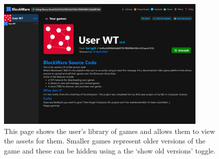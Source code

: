 \begin{figure}[H]
  \centering
  \includegraphics[width=0.9\textwidth]{assets/images/screenshots/library.png}
  \caption{This page shows the user's library of games and allows them to view the assets for them. Smaller games represent older versions of the game and these can be hidden using a the `show old versions' toggle.}
\end{figure}






